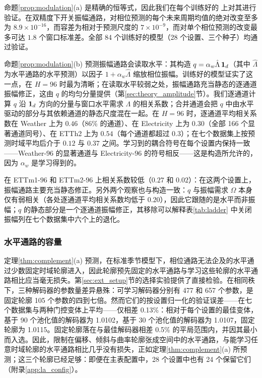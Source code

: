 {
命题\ref{prop:modulation}(a) 是精确的恒等式，因此我们在每个训练好的 \sysplus 上对其进行验证。在双精度下开关振幅通路，对相位预测的每个未来周期均值的绝对改变至多为 $8.9\times10^{-16}$，而容差为相对于预测尺度的 $7\times10^{-9}$，而对单个相位预测的改变最多可达 $1.8$ 个窗口标准差。全部 84 个训练好的模型（28 个设置、三个种子）均通过验证。

命题\ref{prop:modulation}(b) 预测振幅通路会读取水平：其构造 $q=\alpha_w\hat\Lambda\,\mathbf 1_d$（其中 $\hat\Lambda$ 为水平通路的水平预测）以因子 $1+\alpha_w\hat\Lambda$ 缩放相位振幅。训练好的模型证实了这一点，在 $H=96$ 时最为清晰；在读取水平较弱之处，振幅通路充当静态的逐通道振幅修正，这由 $q$ 的均匀分量提供（第\ref{sec:theory_amplitude}节）。我们逐通道计算 $q$ 沿 $\mathbf 1_d$ 方向的分量与窗口水平需求 $\Lambda$ 的相关系数；合并通道会把 $q$ 中由水平驱动的部分与其依赖通道的静态尺度混在一起。在 $H=96$ 时，逐通道平均相关系数在 Weather 上为 $0.46$（86\% 的通道）、在 Electricity 上为 $0.30$（全部 166 个显著通道同号）、在 ETTh2 上为 $0.54$（每个通道都超过 $0.3$）；在七个数据集上按预测时域平均后介于 $0.12$ 与 $0.37$ 之间。学习到的耦合符号在每个设置内保持一致——Weather-$96$ 的显著通道与 Electricity-$96$ 的符号相反——这是构造所允许的，因为 $\alpha_w$ 是学习得到的。

在 ETTm1-$96$ 和 ETTm2-$96$ 上相关系数较低（$0.27$ 和 $0.02$）：在这两个设置上，振幅通路主要充当静态修正。另外两个观察也与构造一致：$q$ 与振幅需求 $\Omega$ 本身仅有弱相关（各处逐通道平均相关系数均低于 $0.20$），因此它跟随的是水平而非振幅；$q$ 的静态部分是一个逐通道振幅修正，其移除可以解释表\ref{tab:ladder} 中关闭振幅列在七个数据集中六个上的退化。

\subsubsection{水平通路的容量}
\label{sec:exp_capacity}

定理\ref{thm:complement}(a) 预测，在标准季节模型下，相位通路无法企及的水平通过少数固定时域轮廓进入，因此轮廓预先固定的水平通路与学习这些轮廓的水平通路相比应当毫无损失。第\ref{sec:ext_setup}节的选择实验提供了直接检验。在相同秩下，三种解码器的参数量差异悬殊：可学习解码器分别有 477 和 657 个参数，是固定轮廓 105 个参数的四到七倍。然而它们的按设置归一化的验证误差——在七个数据集与两种门控变体上平均——仅相差 0.13\%：相对于每个设置的最佳变体，基于 90 个池化值的解码器为 1.0102，基于 30 个池化值的解码器为 1.0107，固定轮廓为 1.0115。固定轮廓落在与最佳解码器相差 0.5\% 的平局范围内，并因其最小而入选。因此，限制在偏移、倾斜与曲率轮廓张成空间中的水平通路，与能学习任意时域轮廓的水平通路相比几乎没有损失，正如定理\ref{thm:complement}(a) 所预测；这三个轮廓已经足够：即便在主表配置中，28 个设置中也有 24 个保留它们（附录\ref{app:la_config}）。

}

